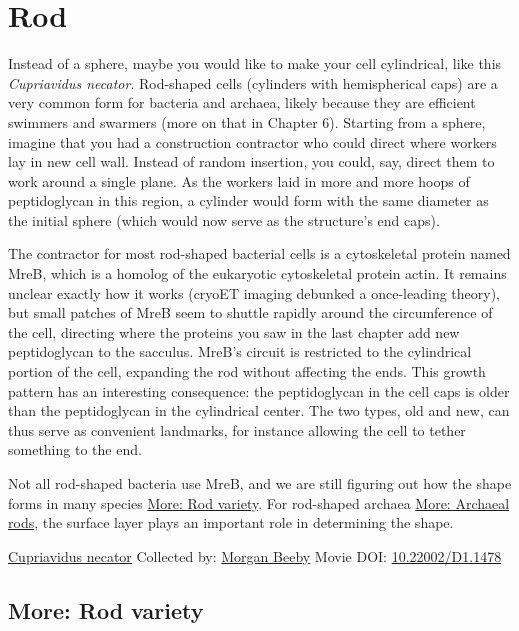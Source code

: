 \documentclass[]{tufte-book}
\begin{document}
\hypertarget{rod}{%
\section{Rod}\label{rod}}

Instead of a sphere, maybe you would like to make your cell cylindrical, like this \emph{Cupriavidus necator}. Rod-shaped cells (cylinders with hemispherical caps) are a very common form for bacteria and archaea, likely because they are efficient swimmers and swarmers (more on that in Chapter 6). Starting from a sphere, imagine that you had a construction contractor who could direct where workers lay in new cell wall. Instead of random insertion, you could, say, direct them to work around a single plane. As the workers laid in more and more hoops of peptidoglycan in this region, a cylinder would form with the same diameter as the initial sphere (which would now serve as the structure's end caps).

The contractor for most rod-shaped bacterial cells is a cytoskeletal protein named MreB, which is a homolog of the eukaryotic cytoskeletal protein actin. It remains unclear exactly how it works (cryoET imaging debunked a once-leading theory), but small patches of MreB seem to shuttle rapidly around the circumference of the cell, directing where the proteins you saw in the last chapter add new peptidoglycan to the sacculus. MreB's circuit is restricted to the cylindrical portion of the cell, expanding the rod without affecting the ends. This growth pattern has an interesting consequence: the peptidoglycan in the cell caps is older than the peptidoglycan in the cylindrical center. The two types, old and new, can thus serve as convenient landmarks, for instance allowing the cell to tether something to the end.

Not all rod-shaped bacteria use MreB, and we are still figuring out how the shape forms in many species \protect\hyperlink{Rod_variety}{More: Rod variety}. For rod-shaped archaea \protect\hyperlink{Archaeal_rods}{More: Archaeal rods}, the surface layer plays an important role in determining the shape.



\hypertarget{htmlwidget-b5b4c0253c7ef7a3f8b6}{}

\label{fig:3-2}\protect\hyperlink{tree}{Cupriavidus necator} Collected by: \protect\hyperlink{morgan_beeby}{Morgan Beeby} Movie DOI: \href{https://doi.org/10.22002/D1.1478}{10.22002/D1.1478}

\hypertarget{Rod_variety}{%
\subsection*{More: Rod variety}\label{Rod_variety}}
\end{document}
